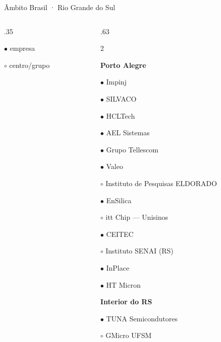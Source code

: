 \begin{frame}{Âmbito Brasil · Rio Grande do Sul}
\begin{columns}[T,onlytextwidth]
\begin{column}{.35\textwidth}
{\tiny $\bullet$ empresa\par $\circ$ centro/grupo}
\end{column}
\begin{column}{.63\textwidth}
\footnotesize\setlength{\columnsep}{3mm}\begin{multicols}{2}\raggedright
\textcolor{blue_theme}{\textbf{Porto Alegre}}\par\smallskip
\noindent\parbox{\linewidth}{$\bullet$ Impinj}\par
\noindent\parbox{\linewidth}{$\bullet$ SILVACO}\par
\noindent\parbox{\linewidth}{$\bullet$ HCLTech}\par
\noindent\parbox{\linewidth}{$\bullet$ AEL Sistemas}\par
\noindent\parbox{\linewidth}{$\bullet$ Grupo Tellescom}\par
\noindent\parbox{\linewidth}{$\bullet$ Valeo}\par
\noindent\parbox{\linewidth}{$\circ$ Instituto de Pesquisas ELDORADO}\par
\noindent\parbox{\linewidth}{$\bullet$ EnSilica}\par
\noindent\parbox{\linewidth}{$\circ$ itt Chip — Unisinos}\par
\noindent\parbox{\linewidth}{$\bullet$ CEITEC}\par
\noindent\parbox{\linewidth}{$\circ$ Instituto SENAI (RS)}\par
\noindent\parbox{\linewidth}{$\bullet$ InPlace}\par
\noindent\parbox{\linewidth}{$\bullet$ HT Micron}\par
\medskip
\textcolor{blue_theme}{\textbf{Interior do RS}}\par\smallskip
\noindent\parbox{\linewidth}{$\bullet$ TUNA Semicondutores}\par
\noindent\parbox{\linewidth}{$\circ$ GMicro UFSM}\par
\medskip
\end{multicols}
\end{column}
\end{columns}
\creditoBrasil
\end{frame}
